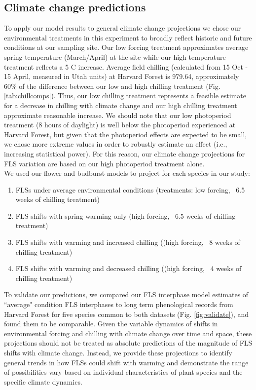 \documentclass[11pt]{article}
\begin{document}
\subsection*{Climate change predictions}
\noindent To apply our model results to general climate change projections we chose our environmental treatments in this experiment to broadly reflect historic and future conditions at our sampling site. Our low forcing treatment approximates average spring temperature (March/April) at the site while our high temperature treatment reflects a 5 \degree C increase. Average field chilling (calculated from 15 Oct - 15 April, measured in Utah units) at Harvard Forest is 979.64, approximately 60\% of the difference between our low and high chilling treatment (Fig. \ref{tab:chillcomps}). Thus, our low chilling treatment represents a feasible estimate for a decrease in chilling with climate change and our high chilling treatment approximate reasonable increase. We should note that our low photoperiod treatment (8 hours of daylight) is well below the photoperiod experienced at Harvard Forest, but given that the photoperiod effects are expected to be small, we chose more extreme values in order to robustly estimate an effect (i.e., increasing statistical power). For this reason, our climate change projections for FLS variation are based on our high photoperiod treatment alone.\\

\noindent We used our flower and budburst models to project for each species in our study:\\
\begin{enumerate}
\item FLSs under average environmental conditions  (treatments: low forcing, ~6.5 weeks of chilling treatment)
\item FLS shifts with spring warming only (high forcing, ~6.5 weeks of chilling treatment)
\item FLS shifts with warming and increased chilling ((high forcing, ~8 weeks of chilling treatment)
\item FLS shifts with warming and decreased chilling ((high forcing, ~4 weeks of chilling treatment)

\end{enumerate}

\noindent To validate our predictions, we compared our FLS interphase model estimates of ``average" condition FLS interphases to long term phenological records from Harvard Forest \citep{OKeefe2015} for five species common to both datasets (Fig. \ref{fig:validate}), and found them to be comparable. Given the variable dynamics of shifts in environmental forcing and chilling with climate change over time and space, these projections should not be treated as absolute predictions of the magnitude of FLS shifts with climate change. Instead, we provide these projections to identify general trends in how FLSs could shift with warming and demonstrate the range of possibilities vary based on individual characteristics of plant species and the specific climate dynamics.\\
\end{document}
